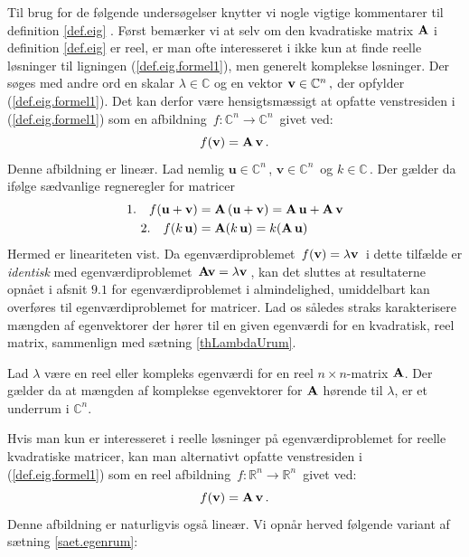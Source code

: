 Til brug for de følgende undersøgelser knytter vi nogle vigtige kommentarer til definition \ref{def.eig} .\bs
Først bemærker vi at selv om den kvadratiske matrix $\mathbf{A}$ i definition \ref{def.eig} er reel, er man ofte interesseret i ikke kun at finde reelle løsninger til ligningen (\ref{def.eig.formel1}), men generelt komplekse løsninger. Der søges med andre ord en skalar $\lambda \in \mathbb C$ og en vektor $\mathbf{v} \in \mathbb C^n\,,$ der opfylder (\ref{def.eig.formel1}). \bs
Det kan derfor være hensigtsmæssigt at opfatte venstresiden i (\ref{def.eig.formel1}) som en afbildning $\,f:\mathbb C^n \rightarrow \mathbb C^n\,$ givet ved:
\begin{equation*}
f(\mathbf{v})=\mathbf{A}\,\mathbf{v}\,.
\end{equation*}
Denne afbildning er lineær. Lad nemlig $\mathbf u\in \mathbb C^n\,$, $\mathbf v\in \mathbb C^n\,$ og $k\in \mathbb C\,.$ Der gælder da ifølge sædvanlige regneregler for matricer 
\begin{equation*}
\begin{aligned}
1.\quad f(\mathbf u + \mathbf{v})&=\mathbf{A}\,(\mathbf u+\mathbf{v})=\mathbf{A}\,\mathbf u +\mathbf{A}\,\mathbf{v}\\
2. \quad f(k\,\mathbf u)&=\mathbf{A}(k\,\mathbf u)=k(\mathbf{A}\,\mathbf u)
\end{aligned}
\end{equation*}
Hermed er lineariteten vist. Da egenværdiproblemet $\,f(\mathbf{v})=\lambda \mathbf{v}\,$ i dette tilfælde er \textit{identisk} med egenværdiproblemet $\,\mathbf{A} \mathbf{v}=\lambda \mathbf{v}\,$, kan det sluttes at resultaterne opnået i afsnit $9.1$ for egenværdiproblemet i almindelighed, umiddelbart kan overføres til egenværdiproblemet for matricer. Lad os således straks karakterisere mængden af egenvektorer der hører til en given egenværdi for en kvadratisk, reel matrix, sammenlign med sætning \ref{thLambdaUrum}.

\begin{theorem} \label{saet.egenrum}
Lad $ \lambda $ være en reel eller kompleks egenværdi for en reel  $n\times n$-matrix  $ \mathbf{A} $. Der gælder da at mængden af komplekse egenvektorer for $ \mathbf{A} $ hørende til $ \lambda $, er et underrum i $\mathbb C^n$. 
\end{theorem}

Hvis man kun er interesseret i reelle løsninger på egenværdiproblemet for reelle kvadratiske matricer, kan man alternativt opfatte venstresiden i (\ref{def.eig.formel1}) som en reel afbildning $\,f:\mathbb R^n \rightarrow \mathbb R^n\,$ givet ved:
\begin{equation*}
f(\mathbf{v})=\mathbf{A}\,\mathbf{v}\,.
\end{equation*}
Denne afbildning er naturligvis også lineær. Vi opnår herved følgende variant af sætning \ref{saet.egenrum}:

